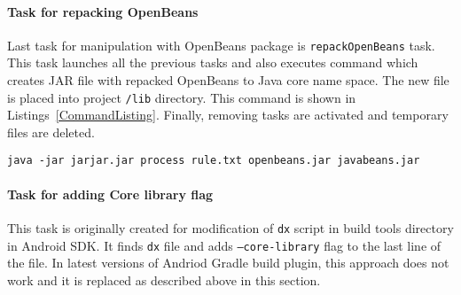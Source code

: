 \paragraph{Task for repacking OpenBeans}
Last task for manipulation with OpenBeans package is \texttt{repackOpenBeans} task. This task launches all the previous
tasks and also executes command which creates JAR file with repacked OpenBeans to Java core name space. The new file is
placed into project \texttt{/lib} directory. This command is shown in Listings~\ref{CommandListing}. Finally,
removing tasks are activated and temporary files are deleted.
\\
\begin{lstlisting}[captionpos={b},caption={Command for repacking \texttt{openbeans.jar} file.},frame={lines},
label={CommandListing},basicstyle=\footnotesize]
java -jar jarjar.jar process rule.txt openbeans.jar javabeans.jar
\end{lstlisting}

\paragraph{Task for adding Core library flag}
This task is originally created for modification of \texttt{dx} script in build tools directory in Android SDK. It finds
\texttt{dx} file and adds \texttt{--core-library} flag to the last line of the file. In latest versions of Andriod
Gradle build plugin, this approach does not work and it is replaced as described above in this section.
